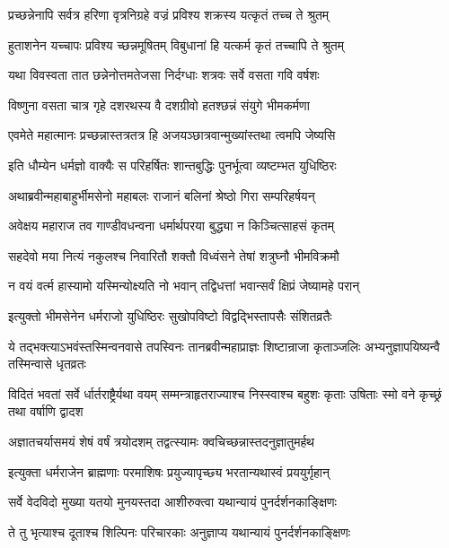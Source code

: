 \twolineshloka
{प्रच्छन्नेनापि सर्वत्र हरिणा वृत्रनिग्रहे}
{वज्रं प्रविश्य शक्रस्य यत्कृतं तच्च ते श्रुतम्}


\twolineshloka
{हुताशनेन यच्चापः प्रविश्य च्छन्नमूषितम्}
{विबुधानां हि यत्कर्म कृतं तच्चापि ते श्रुतम्}


\twolineshloka
{यथा विवस्वता तात छन्नेनोत्तमतेजसा}
{निर्दग्धाः शत्रवः सर्वे वसता गवि वर्षशः}


\twolineshloka
{विष्णुना वसता चात्र गृहे दशरथस्य वै}
{दशग्रीवो हतश्छन्नं संयुगे भीमकर्मणा}


\twolineshloka
{एवमेते महात्मानः प्रच्छन्नास्तत्रतत्र हि}
{अजयञ्छात्रवान्मुख्यांस्तथा त्वमपि जेष्यसि}



\twolineshloka
{इति धौम्येन धर्मज्ञो वाक्यैः स परिहर्षितः}
{शान्तबुद्धिः पुनर्भूत्वा व्यष्टम्भत युधिष्ठिरः}


\twolineshloka
{अथाब्रवीन्महाबाहुर्भीमसेनो महाबलः}
{राजानं बलिनां श्रेष्ठो गिरा सम्परिहर्षयन्}


\twolineshloka
{अवेक्षय महाराज तव गाण्डीवधन्वना}
{धर्मार्थपरया बुद्ध्या न किञ्चित्साहसं कृतम्}


\twolineshloka
{सहदेवो मया नित्यं नकुलश्च निवारितौ}
{शक्तौ विध्वंसने तेषां शत्रुघ्नौ भीमविक्रमौ}


\twolineshloka
{न वयं वर्त्म हास्यामो यस्मिन्योक्ष्यति नो भवान्}
{तद्विधत्तां भवान्सर्वं क्षिप्रं जेष्यामहे परान्}


\twolineshloka
{इत्युक्तो भीमसेनेन धर्मराजो युधिष्ठिरः}
{सुखोपविष्टो विद्वद्भिस्तापसैः संशितव्रतैः}


\threelineshloka
{ये तद्भक्त्याऽभवंस्तस्मिन्वनवासे तपस्विनः}
{तानब्रवीन्महाप्राज्ञः शिष्टान्राजा कृताञ्जलिः}
{अभ्यनुज्ञापयिष्यन्वै तस्मिन्वासे धृतव्रतः}


\threelineshloka
{विदितं भवतां सर्वे र्धार्तराष्ट्रैर्यथा वयम्}
{सम्मन्त्राहृतराज्याश्च निस्स्वाश्च बहुशः कृताः}
{उषिताः स्मो वने कृच्छ्रं तथा वर्षाणि द्वादश}


\twolineshloka
{अज्ञातचर्यासमयं शेषं वर्षं त्रयोदशम्}
{तद्वत्स्यामः क्वचिच्छन्नास्तदनुज्ञातुमर्हथ}


\twolineshloka
{इत्युक्ता धर्मराजेन ब्राह्मणाः परमाशिषः}
{प्रयुज्यापृच्छ्य भरतान्यथास्वं प्रययुर्गृहान्}


\twolineshloka
{सर्वे वेदविदो मुख्या यतयो मुनयस्तदा}
{आशीरुक्त्वा यथान्यायं पुनर्दर्शनकाङ्क्षिणः}


\twolineshloka
{ते तु भृत्याश्च दूताश्च शिल्पिनः परिचारकाः}
{अनुज्ञाप्य यथान्यायं पुनर्दर्शनकाङ्क्षिणः}


